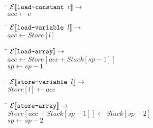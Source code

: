 \begin{tabbing}
\qquad \= \quad \kill
${\mathcal{E}{\normalfont [\![} \text{{\tt load-constant }} c {\normalfont ]\!]}} \rightarrow$\\
\>$acc \leftarrow c$
\end{tabbing}

\begin{tabbing}
\qquad \= \quad \kill
${\mathcal{E}{\normalfont [\![} \text{{\tt load-variable }} l {\normalfont ]\!]}} \rightarrow$\\
\>$acc \leftarrow Store[l]$
\end{tabbing}

\begin{tabbing}
\qquad \= \quad \kill
${\mathcal{E}{\normalfont [\![} \text{{\tt load-array}} {\normalfont ]\!]}} \rightarrow$\\
\>$acc \leftarrow Store[acc+Stack[sp-1]]$\\
\>$sp \leftarrow sp-1$
\end{tabbing}

\begin{tabbing}
\qquad \= \quad \kill
${\mathcal{E}{\normalfont [\![} \text{{\tt store-variable }} l {\normalfont ]\!]}} \rightarrow$\\
\>$Store[l] \leftarrow acc$
\end{tabbing}

\begin{tabbing}
\qquad \= \quad \kill
${\mathcal{E}{\normalfont [\![} \text{{\tt store-array}} {\normalfont ]\!]}} \rightarrow$\\
\>$Store[acc+Stack[sp-1]] \leftarrow Stack[sp-2]$\\
\>$sp \leftarrow sp-2$
\end{tabbing}


